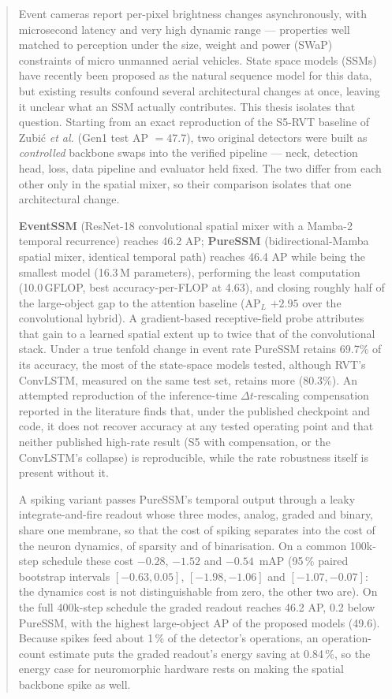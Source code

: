 \documentclass[11pt, a4paper]{report}
\begin{document}
\begin{abstract}
Event cameras report per-pixel brightness changes asynchronously, with microsecond latency and very
high dynamic range --- properties well matched to perception under the size, weight and power (SWaP)
constraints of micro unmanned aerial vehicles. State space models (SSMs) have recently been proposed
as the natural sequence model for this data, but existing results confound several architectural
changes at once, leaving it unclear what an SSM actually contributes. This thesis isolates that
question. Starting from an exact reproduction of the S5-RVT baseline of Zubi\'c \emph{et al.}
(Gen1 test AP $=47.7$), two original detectors were built as \emph{controlled} backbone swaps into
the verified pipeline --- neck, detection head, loss, data pipeline and evaluator held fixed. The two
differ from each other only in the spatial mixer, so their comparison isolates that one architectural
change.

\textbf{EventSSM} (ResNet-18 convolutional spatial mixer with a Mamba-2 temporal recurrence) reaches
46.2 AP; \textbf{PureSSM} (bidirectional-Mamba spatial mixer, identical temporal path) reaches 46.4 AP
while being the smallest model (16.3\,M parameters), performing the least computation (10.0\,GFLOP,
best accuracy-per-FLOP at 4.63), and closing roughly half of the large-object gap to the attention
baseline ($\mathrm{AP}_L$ $+2.95$ over the convolutional hybrid). A gradient-based receptive-field
probe attributes that gain to a learned spatial extent up to twice that of the convolutional stack.
Under a true tenfold change in event rate PureSSM retains 69.7\% of its accuracy, the most of the
state-space models tested, although RVT's ConvLSTM, measured on the same test set, retains more
(80.3\%). An attempted reproduction of the inference-time $\Delta t$-rescaling compensation reported in
the literature finds that, under the published checkpoint and code, it does not recover accuracy at any
tested operating point and that neither published high-rate result (S5 with compensation, or the
ConvLSTM's collapse) is reproducible, while the rate robustness itself is present without it.

A spiking variant passes PureSSM's temporal output through a leaky integrate-and-fire readout whose three
modes, analog, graded and binary, share one membrane, so that the cost of spiking separates into the cost
of the neuron dynamics, of sparsity and of binarisation. On a common 100k-step schedule these cost
$-0.28$, $-1.52$ and $-0.54$~mAP (95\,\% paired bootstrap intervals $[-0.63, 0.05]$, $[-1.98, -1.06]$ and
$[-1.07, -0.07]$: the dynamics cost is not distinguishable from zero, the other two are). On the full
400k-step schedule the graded readout reaches 46.2 AP, 0.2 below PureSSM, with the highest large-object
AP of the proposed models (49.6). Because spikes feed about 1\,\% of the detector's operations, an
operation-count estimate puts the graded readout's energy saving at 0.84\,\%, so the energy case for
neuromorphic hardware rests on making the spatial backbone spike as well.

\end{abstract}
\end{document}
